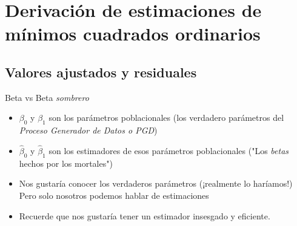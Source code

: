 \section{Derivación de estimaciones de mínimos cuadrados ordinarios}

\subsection{Valores ajustados y residuales}
\begin{frame}{Beta vs Beta \textit{sombrero}}
	\begin{itemize}
		\item $\beta_{0}$ y $\beta_{1}$ son los parámetros poblacionales (los verdadero parámetros del \textit{Proceso Generador de Datos o PGD})
		\item $\widehat{\beta}_{0}$ y $\widehat{\beta}_{1}$ son los estimadores de esos parámetros poblacionales ("Los \textit{betas} hechos por los mortales")
		\item Nos gustaría conocer los verdaderos parámetros (¡realmente lo haríamos!) Pero solo nosotros podemos hablar de estimaciones
		\item Recuerde que nos gustaría tener un estimador insesgado y eficiente.
	\end{itemize}
\end{frame}

